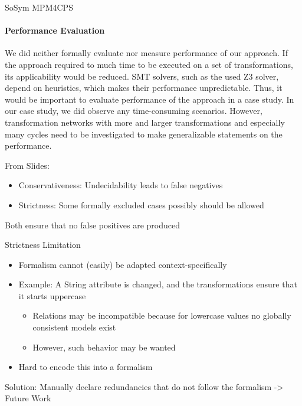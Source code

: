 \begin{copiedFrom}{SoSym MPM4CPS}
\paragraph{Performance Evaluation}
We did neither formally evaluate nor measure performance of our approach.
If the approach required to much time to be executed on a set of transformations, its applicability would be reduced.
SMT solvers, such as the used Z3 solver, depend on heuristics, which makes their performance unpredictable.
Thus, it would be important to evaluate performance of the approach in a case study.
In our case study, %
we did observe any time-consuming scenarios.
However, transformation networks with more and larger transformations and especially many cycles need to be investigated to make generalizable statements on the performance.


From Slides:
\begin{itemize}
    \item Conservativeness: Undecidability leads to false negatives
    \item Strictness: Some formally excluded cases possibly should be allowed
\end{itemize}
Both ensure that no false positives are produced

Strictness Limitation
\begin{itemize}
    \item Formalism cannot (easily) be adapted context-specifically
    \item Example: A String attribute is changed, and the transformations ensure that it starts uppercase
    \begin{itemize}
        \item Relations may be incompatible because for lowercase values no globally consistent models exist
        \item However, such behavior may be wanted
    \end{itemize}
    \item Hard to encode this into a formalism
\end{itemize}
Solution: Manually declare redundancies that do not follow the formalism -> Future Work


\end{copiedFrom}
